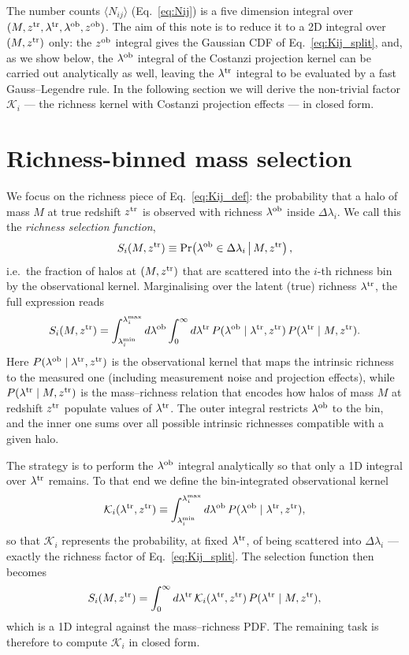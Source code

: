 \documentclass[a4paper, 11pt]{article}
\newcommand{\ltr}{\lambda^{\rm tr}}
\newcommand{\lob}{\lambda^{\rm ob}}
\newcommand{\ztr}{z^{\rm tr}}
\newcommand{\zob}{z^{\rm ob}}
\begin{document}
The number counts $\langle N_{ij}\rangle$ (Eq.~\eqref{eq:Nij}) is a five dimension integral over $(M,\ztr,\ltr,\lob,\zob)$. The aim of this note is to reduce it to a 2D integral over $(M,\ztr)$ only: the $\zob$ integral gives the Gaussian CDF of Eq.~\eqref{eq:Kij_split}, and, as we show below, the $\lob$ integral of the Costanzi projection kernel can be carried out analytically as well, leaving the $\ltr$ integral to be evaluated by a fast Gauss--Legendre rule. In the following section we will derive the non-trivial factor $\mathcal K_i$ --- the richness kernel with Costanzi projection effects --- in closed form.

\section{Richness-binned mass selection}

We focus on the richness piece of Eq.~\eqref{eq:Kij_def}: the probability that a halo of mass $M$ at true redshift $\ztr$ is observed with richness $\lob$ inside $\Delta\lambda_i$. We call this the \emph{richness selection function},
\begin{equation}
S_i(M,\ztr)
\equiv
\mathrm{Pr}\!\left(\lob \in \Delta\lambda_i \,\middle|\, M,\ztr\right),
\label{eq:Pi_def}
\end{equation}
i.e.\ the fraction of halos at $(M,\ztr)$ that are scattered into the $i$-th richness bin by the observational kernel. Marginalising over the latent (true) richness $\ltr$, the full expression reads
\begin{equation}
S_i(M,\ztr)
=
\int_{\lambda_i^{\min}}^{\lambda_i^{\max}} d\lob
\int_0^\infty d\ltr\,
P(\lob\mid \ltr,\ztr)\,
P(\ltr\mid M,\ztr).
\label{eq:full_integral}
\end{equation}
Here $P(\lob\mid\ltr,\ztr)$ is the observational kernel that maps the intrinsic richness to the measured one (including measurement noise and projection effects), while $P(\ltr\mid M,\ztr)$ is the mass--richness relation that encodes how halos of mass $M$ at redshift $\ztr$ populate values of $\ltr$. The outer integral restricts $\lob$ to the bin, and the inner one sums over all possible intrinsic richnesses compatible with a given halo.

The strategy is to perform the $\lob$ integral analytically so that only a 1D integral over $\ltr$ remains. To that end we define the bin-integrated observational kernel
\begin{equation}
\mathcal K_i(\ltr,\ztr)
\equiv
\int_{\lambda_i^{\min}}^{\lambda_i^{\max}}
d\lob\,
P(\lob\mid \ltr,\ztr),
\label{eq:Ki_def}
\end{equation}
so that $\mathcal K_i$ represents the probability, at fixed $\ltr$, of being scattered into $\Delta\lambda_i$ --- exactly the richness factor of Eq.~\eqref{eq:Kij_split}. The selection function then becomes
\begin{equation}
S_i(M,\ztr)
=
\int_0^\infty d\ltr\,
\mathcal K_i(\ltr,\ztr)\,
P(\ltr\mid M,\ztr),
\label{eq:Pi_reduced}
\end{equation}
which is a 1D integral against the mass--richness PDF. The remaining task is therefore to compute $\mathcal K_i$ in closed form.
\end{document}

